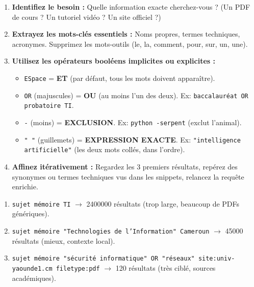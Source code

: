 \documentclass[11pt]{article}
\begin{document}
\begin{methode}
\begin{enumerate}
    \item \textbf{Identifiez le besoin :} Quelle information exacte cherchez-vous ? (Un PDF de cours ? Un tutoriel vidéo ? Un site officiel ?)
    \item \textbf{Extrayez les mots-clés essentiels :} Noms propres, termes techniques, acronymes. Supprimez les mots-outils (le, la, comment, pour, sur, un, une).
    \item \textbf{Utilisez les opérateurs booléens implicites ou explicites :}
          \begin{itemize}
              \item \texttt{ESpace} = \textbf{ET} (par défaut, tous les mots doivent apparaître).
              \item \texttt{OR} (majuscules) = \textbf{OU} (au moins l'un des deux). Ex: \texttt{baccalauréat OR probatoire TI}.
              \item \texttt{-} (moins) = \textbf{EXCLUSION}. Ex: \texttt{python -serpent} (exclut l'animal).
              \item \texttt{" "} (guillemets) = \textbf{EXPRESSION EXACTE}. Ex: \texttt{"intelligence artificielle"} (les deux mots collés, dans l'ordre).
          \end{itemize}
    \item \textbf{Affinez itérativement :} Regardez les 3 premiers résultats, repérez des synonymes ou termes techniques vus dans les snippets, relancez la requête enrichie.
\end{enumerate}
\end{methode}

\begin{exemplebox}
\begin{enumerate}
    \item \texttt{sujet mémoire TI} $\rightarrow$ \num{2 400 000} résultats (trop large, beaucoup de PDFs génériques).
    \item \texttt{sujet mémoire "Technologies de l'Information" Cameroun} $\rightarrow$ \num{45 000} résultats (mieux, contexte local).
    \item \texttt{sujet mémoire "sécurité informatique" OR "réseaux" site:univ-yaounde1.cm filetype:pdf} $\rightarrow$ \num{120} résultats (très ciblé, sources académiques).
\end{enumerate}
\end{exemplebox}
\end{document}
